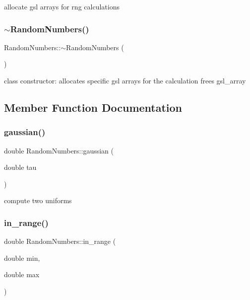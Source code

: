 allocate gsl arrays for rng calculations \mbox{\label{class_random_numbers_a29b02e7197c0c93eecb22b81c615889b}} 
\subsubsection{\texorpdfstring{$\sim$RandomNumbers()}{~RandomNumbers()}}
{\footnotesize\ttfamily Random\+Numbers\+::$\sim$\+Random\+Numbers (\begin{DoxyParamCaption}{ }\end{DoxyParamCaption})}

class constructor\+: allocates specific gsl arrays for the calculation frees gsl\+\_\+array 

\subsection{Member Function Documentation}
\mbox{\label{class_random_numbers_a98ae0cc416acc48bee0d33cd6cc79190}} 
\subsubsection{\texorpdfstring{gaussian()}{gaussian()}}
{\footnotesize\ttfamily double Random\+Numbers\+::gaussian (\begin{DoxyParamCaption}\item[{double}]{tau }\end{DoxyParamCaption})}

compute two uniforms \mbox{\label{class_random_numbers_a3a982a5e1cc0b981d829dd64ce1ee787}} 
\subsubsection{\texorpdfstring{in\_range()}{in\_range()}}
{\footnotesize\ttfamily double Random\+Numbers\+::in\+\_\+range (\begin{DoxyParamCaption}\item[{double}]{min,  }\item[{double}]{max }\end{DoxyParamCaption})}

